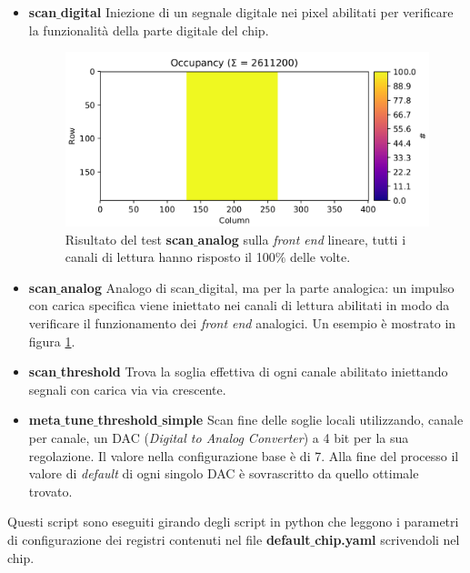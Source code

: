 \begin{itemize}
\item \textbf{scan$\_$digital} Iniezione di un segnale digitale nei pixel abilitati per verificare la funzionalità della parte digitale del chip.%
\begin{figure}
\centering
\includegraphics[width=\textwidth]{Immagini/ScanAnalogLinear}
\caption{Risultato del test \textbf{scan$\_$analog} sulla \textit{front end} lineare, tutti i canali di lettura hanno risposto il 100$\%$ delle volte.}
\label{ScanAnalogLinear}
\end{figure}
\item \textbf{scan$\_$analog} Analogo di scan$\_$digital, ma per la parte analogica: un impulso con carica specifica viene iniettato nei canali di lettura abilitati in modo da verificare il funzionamento dei \textit{front end} analogici. Un esempio è mostrato in figura \ref{ScanAnalogLinear}. %
\item \textbf{scan$\_$threshold} Trova la soglia effettiva di ogni canale abilitato iniettando segnali con carica via via crescente.%
\item \textbf{meta$\_$tune$\_$threshold$\_$simple} Scan fine delle soglie locali utilizzando, canale per canale, un DAC (\textit{Digital to Analog Converter}) a 4 bit per la sua regolazione. Il valore nella configurazione base è di 7.
  Alla fine del processo il valore di \textit{default} di ogni singolo DAC è sovrascritto da quello ottimale trovato.
\end{itemize}
Questi script sono eseguiti girando degli script in python che leggono i parametri di configurazione dei registri contenuti nel file \textbf{default$\_$chip.yaml} scrivendoli nel chip.

